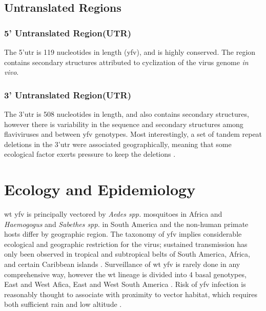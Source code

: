 \subsection{Untranslated Regions}
\subsubsection{5' Untranslated Region(UTR)}
 The 5'\gls{utr} is 119 nucleotides in length (\gls{yfv}), and is highly conserved. The region contains secondary structures attributed to cyclization of the virus genome \emph{in vivo}.
 
\subsubsection{3' Untranslated Region(UTR)}
The 3'\gls{utr} is 508 nucleotides in length, and also contains secondary structures, however there is variability in the sequence and secondary structures among flaviviruses and between \gls{yfv} genotypes. Most interestingly, a set of tandem repeat deletions in the 3'\gls{utr} were associated geographically, meaning that some ecological factor exerts pressure to keep the deletions \parencite{Bryant:2005dq}.


\section{Ecology and Epidemiology}
\Gls{wt} \gls{yfv} is principally vectored by \emph{Aedes spp.} mosquitoes in Africa and \emph{Haemogogus} and \emph{Sabethes spp.} in South America and the non-human primate hosts differ by geographic region. The taxonomy of \gls{yfv} implies considerable ecological and geographic restriction for the virus; sustained transmission has only been observed in tropical and subtropical belts of South America, Africa, and certain Caribbean islands \parencite{Jentes:2011et}. Surveillance of \gls{wt} \gls{yfv} is rarely done in any comprehensive way, however the \gls{wt} lineage is divided into 4 basal genotypes, East and West Afica, East and West South America \parencite{Bryant:2007kx}. Risk of \gls{yfv} infection is reasonably thought to associate with proximity to vector habitat, which requires both sufficient rain and low altitude \parencite{Jentes:2011et}.

